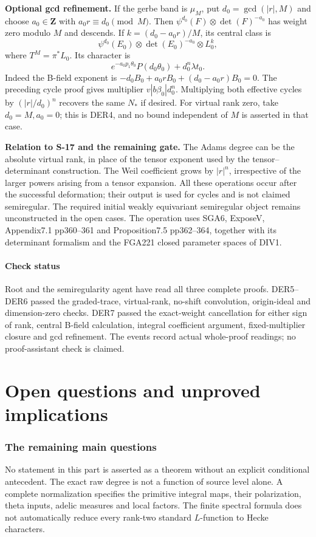 \documentclass[11pt,a4paper]{article}
\theoremstyle{definition}
\begin{document}
\textbf{Optional gcd refinement.} If the gerbe band is \(\mu_M\), put
\(d_0=\gcd(|r|,M)\) and choose \(a_0\in\mathbf Z\) with
\(a_0r\equiv d_0\pmod M\). Then \(\psi^{d_0}(F)\otimes\det(F)^{-a_0}\)
has weight zero modulo \(M\) and descends. If \(k=(d_0-a_0r)/M\), its
central class is \[
 \psi^{d_0}(E_0)\otimes\det(E_0)^{-a_0}\otimes L_0^k,
\] where \(T^M=\pi^*L_0\). Its character is \[
 e^{-a_0p_1\theta_0}P(d_0\theta_0)+d_0^n\lambda t_0.
\] Indeed the B-field exponent is \(-d_0B_0+a_0rB_0+(d_0-a_0r)B_0=0\).
The preceding cycle proof gives multiplier \(v|b\beta_0|d_0^n\).
Multiplying both effective cycles by \((|r|/d_0)^n\) recovers the same
\(N_*\) if desired. For virtual rank zero, take \(d_0=M,a_0=0\); this is
DER4, and no bound independent of \(M\) is asserted in that case.

\textbf{Relation to S-17 and the remaining gate.} The Adams degree can
be the absolute virtual rank, in place of the tensor exponent used by
the tensor--determinant construction. The Weil coefficient grows by
\(|r|^n\), irrespective of the larger powers arising from a tensor
expansion. All these operations occur after the successful deformation;
their output is used for cycles and is not claimed semiregular. The
required initial weakly equivariant semiregular object remains
unconstructed in the open cases. The operation uses SGA6, ExposeV,
Appendix7.1 pp360--361 and Proposition7.5 pp362--364, together with its
determinant formalism and the FGA221 closed parameter spaces of DIV1.

\subsection{Check status}\label{derived-functors-check-status}

Root and the semiregularity agent have read all three complete proofs.
DER5--DER6 passed the graded-trace, virtual-rank, no-shift convolution,
origin-ideal and dimension-zero checks. DER7 passed the exact-weight
cancellation for either sign of rank, central B-field calculation,
integral coefficient argument, fixed-multiplier closure and gcd
refinement. The events record actual whole-proof readings; no
proof-assistant check is claimed.

\clearpage
\part{Open questions and unproved implications}
\section{The remaining main questions}
No statement in this part is asserted as a theorem without an explicit
conditional antecedent. The exact raw degree is not a function of source
level alone. A complete normalization specifies the primitive integral
maps, their polarization, theta inputs, adelic measures and local factors.
The finite spectral formula does not automatically reduce every rank-two
standard $L$-function to Hecke characters.
\end{document}
